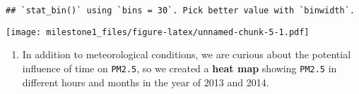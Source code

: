\documentclass[]{article}
\newenvironment{Shaded}{\begin{snugshade}}{\end{snugshade}}
\newcommand{\FloatTok}[1]{\textcolor[rgb]{0.00,0.00,0.81}{#1}}
\newcommand{\KeywordTok}[1]{\textcolor[rgb]{0.13,0.29,0.53}{\textbf{#1}}}
\newcommand{\NormalTok}[1]{#1}
\newcommand{\OperatorTok}[1]{\textcolor[rgb]{0.81,0.36,0.00}{\textbf{#1}}}
\newcommand{\StringTok}[1]{\textcolor[rgb]{0.31,0.60,0.02}{#1}}
\providecommand{\tightlist}{%
  \setlength{\itemsep}{0pt}\setlength{\parskip}{0pt}}
\begin{document}
\begin{Shaded}
\end{Shaded}

\begin{verbatim}
## `stat_bin()` using `bins = 30`. Pick better value with `binwidth`.
\end{verbatim}

\texttt{[image: milestone1\_files/figure-latex/unnamed-chunk-5-1.pdf]}

\begin{enumerate}
\def\labelenumi{\arabic{enumi}.}
\setcounter{enumi}{2}
\tightlist
\item
  In addition to meteorological conditions, we are curious about the
  potential influence of time on \texttt{PM2.5}, so we created a
  \textbf{heat map} showing \texttt{PM2.5} in different hours and months
  in the year of 2013 and 2014.
\end{enumerate}
\end{document}
